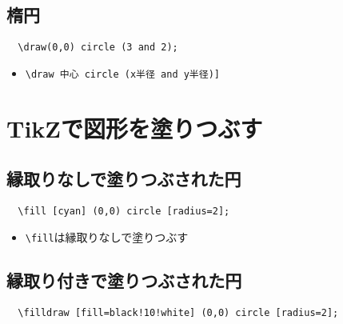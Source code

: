 \documentclass[16pt,b5paper]{article}
\begin{document}
\subsection{楕円}


\begin{lstlisting}
  \draw(0,0) circle (3 and 2);
\end{lstlisting}

\begin{itemize}
  \item \verb|\draw 中心 circle (x半径 and y半径)]|
\end{itemize}

\section{TikZで図形を塗りつぶす}

\subsection{縁取りなしで塗りつぶされた円}


\begin{lstlisting}
  \fill [cyan] (0,0) circle [radius=2];
\end{lstlisting}

\begin{itemize}
  \item \verb|\fill|は縁取りなしで塗りつぶす
\end{itemize}

\subsection{縁取り付きで塗りつぶされた円}


\begin{lstlisting}
  \filldraw [fill=black!10!white] (0,0) circle [radius=2];
\end{lstlisting}
\end{document}
